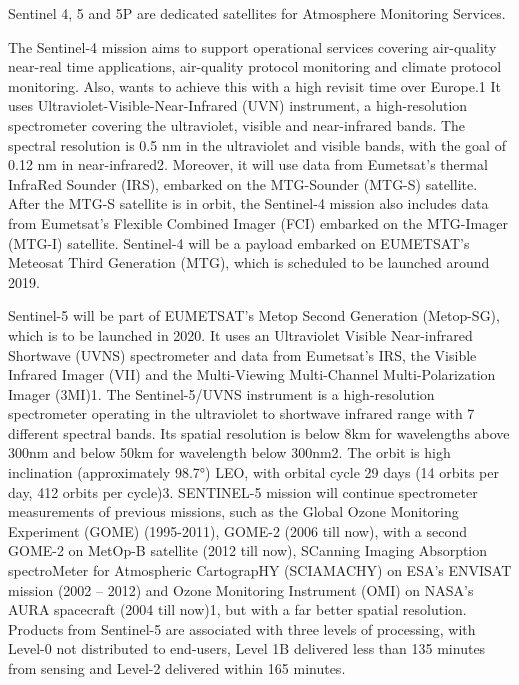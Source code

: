 \documentclass[9pt]{report}
\begin{document}
Sentinel 4, 5 and 5P are dedicated satellites for Atmosphere Monitoring Services.%

The Sentinel-4 mission aims to support operational services covering air-quality near-real time applications, air-quality protocol monitoring and climate protocol monitoring. Also, wants to achieve this with a high revisit time over Europe.1 It uses Ultraviolet-Visible-Near-Infrared (UVN) instrument, a high-resolution spectrometer covering the ultraviolet, visible and near-infrared bands. The spectral resolution is 0.5 nm in the ultraviolet and visible bands, with the goal of 0.12 nm in near-infrared2. Moreover, it will use data from Eumetsat's thermal InfraRed Sounder (IRS), embarked on the MTG-Sounder (MTG-S) satellite. After the MTG-S satellite is in orbit, the Sentinel-4 mission also includes data from Eumetsat's Flexible Combined Imager (FCI) embarked on the MTG-Imager (MTG-I) satellite. Sentinel-4 will be a payload embarked on EUMETSAT's Meteosat Third Generation (MTG), which is scheduled to be launched around 2019.%

Sentinel-5 will be part of EUMETSAT's Metop Second Generation (Metop-SG), which is to be launched in 2020. It uses an Ultraviolet Visible Near-infrared Shortwave (UVNS) spectrometer and data from Eumetsat's IRS, the Visible Infrared Imager (VII) and the Multi-Viewing Multi-Channel Multi-Polarization Imager (3MI)1. The Sentinel-5/UVNS instrument is a high-resolution spectrometer operating in the ultraviolet to shortwave infrared range with 7 different spectral bands. Its spatial resolution is below 8km for wavelengths above 300nm and below 50km for wavelength below 300nm2. The orbit is high inclination (approximately 98.7°) LEO, with orbital cycle 29 days (14 orbits per day, 412 orbits per cycle)3. SENTINEL-5 mission will continue spectrometer measurements of previous missions, such as the Global Ozone Monitoring Experiment (GOME) (1995-2011), GOME-2 (2006 till now), with a second GOME-2 on MetOp-B satellite (2012 till now), SCanning Imaging Absorption spectroMeter for Atmospheric CartograpHY (SCIAMACHY) on ESA's ENVISAT mission (2002 – 2012) and Ozone Monitoring Instrument (OMI) on NASA's AURA spacecraft (2004 till now)1, but with a far better spatial resolution. Products from Sentinel-5 are associated with three levels of processing, with Level-0 not distributed to end-users, Level 1B delivered less than 135 minutes from sensing and Level-2 delivered within 165 minutes.%
\end{document}

